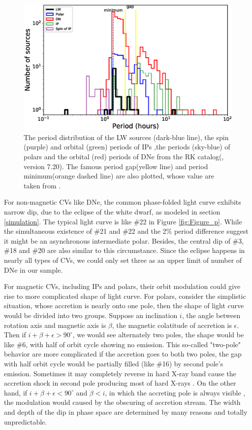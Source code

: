 \documentclass[twoside,twocolumn]{aastex63}
\begin{document}
\begin{figure}[htbp]
\centering
\includegraphics[scale=0.73]{./figure/CV/N_P.eps}
\caption{The period distribution of the LW sources (dark-blue line), the spin (purple) and orbital (green) periods of IPs ,the periods (sky-blue) of polars and the orbital (red) periods of DNe from the RK catalog(\cite{2003A&A...404..301R}, version 7.20). The famous period gap(yellow line) and period minimum(orange dashed line) are also plotted, whose value are taken from \citep{2011ApJS..194...28K}.\label{fig:N_P}}
\end{figure}
For non-magnetic CVs like DNe, the common phase-folded light curve exhibits narrow dip, due to the eclipse of the white dwarf, as modeled in section \ref{simulation}. The typical light curve is like \#22 in Figure \ref{fig:Figure_p}. 	While the simultaneous existence of \#21 and \#22 and the 2\% period difference suggest it might be an asynchronous intermediate polar. Besides, the central dip of \#3, \#18 and \#20 are also similar to this circumstance. Since the eclipse happens in nearly all types of CVs, we could only set three as an upper limit of number of DNe in our sample.

For magnetic CVs, including IPs and polars, their orbit modulation could give rise to more complicated shape of light curve. For polars, consider the simplistic situation, whose accretion is nearly onto one pole, then the shape of light curve would be divided into two groups. Suppose an inclination $i$, the angle between rotation axis and magnetic axis is $\beta$, the magnetic colatitude of accretion is $\epsilon$. Then if $i+\beta+\epsilon > 90^{\circ}$, we would see alternately two poles, the shape would be like \#6, with half of orbit cycle showing no emission. This so-called "two-pole"  behavior are more complicated if the accretion goes to both two poles, the gap with half orbit cycle would be partially filled (like \#16) by second pole's emission. Sometimes it may completely reverse in hard X-ray band cause the accretion shock in second pole producing most of hard X-rays \citep{1985A&A...148L..14H}. On the other hand, if $i+\beta+\epsilon < 90^{\circ}$ and $\beta < i$, in which the accreting pole is always visible , the modulation would caused by the obscuring of accretion stream. The width and depth of the dip in phase space are determined by many reasons and totally unpredictable. 
\end{document}
